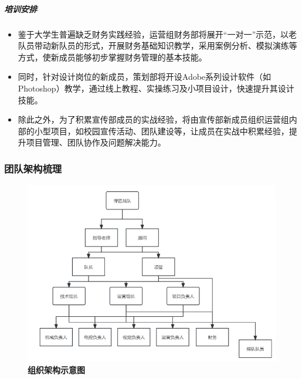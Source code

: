             \subparagraph{培训安排}



                \begin{itemize}
                    \item 鉴于大学生普遍缺乏财务实践经验，运营组财务部将展开“一对一”示范，以老队员带动新队员的形式，开展财务基础知识教学，采用案例分析、模拟演练等方式，使新成员能够初步掌握财务管理的基本技能。
                    \item 同时，针对设计岗位的新成员，策划部将开设Adobe系列设计软件（如Photoshop）教学，通过线上教程、实操练习及小项目设计，快速提升其设计技能。
                    \item 除此之外，为了积累宣传部成员的实战经验，将由宣传部新成员组织运营组内部的小型项目，如校园宣传活动、团队建设等，让成员在实战中积累经验，提升项目管理、团队协作及问题解决能力。
                \end{itemize}

    \subsubsection{团队架构梳理}

        \begin{figure}[H]
                    \centering
                    \includegraphics[height=0.9\textwidth]{figure/teamStructure_review.png}
                    \hspace{0.5em}
                    \caption{\textbf{\textbf{组织架构示意图}}}
                    \label{fig:teamStructure_review}
        \end{figure}